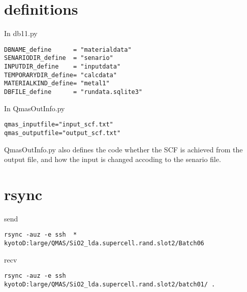 \documentclass[a4paper]{article}
\begin{document}
\appendix
\section{definitions}

In db11.py
\begin{verbatim}
DBNAME_define      = "materialdata"
SENARIODIR_define  = "senario"
INPUTDIR_define    = "inputdata"
TEMPORARYDIR_define= "calcdata"
MATERIALKIND_define= "metal1"
DBFILE_define      = "rundata.sqlite3"
\end{verbatim}

In QmasOutInfo.py
\begin{verbatim}
qmas_inputfile="input_scf.txt"
qmas_outputfile="output_scf.txt"
\end{verbatim}
QmasOutInfo.py also defines the code whether the SCF is achieved from the output file, and how the input is changed accoding to the senario file.

\section{rsync}
send
\begin{verbatim}
rsync -auz -e ssh  * kyotoD:large/QMAS/SiO2_lda.supercell.rand.slot2/Batch06
\end{verbatim}
recv
\begin{verbatim}
rsync -auz -e ssh kyotoD:large/QMAS/SiO2_lda.supercell.rand.slot2/batch01/ .
\end{verbatim}
\end{document}
